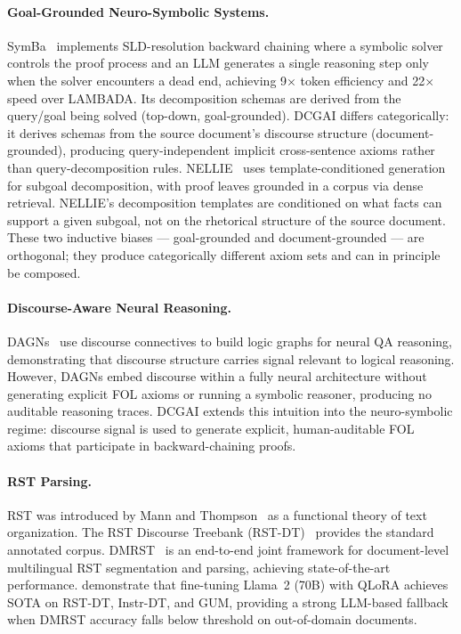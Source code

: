 \documentclass[11pt,letterpaper]{article}
\begin{document}
\paragraph{Goal-Grounded Neuro-Symbolic Systems.}
SymBa~\citep{Lee2024} implements SLD-resolution backward chaining where a symbolic solver controls the proof process
and an LLM generates a single reasoning step only when the solver encounters a dead end, achieving 9$\times$ token
efficiency and 22$\times$ speed over LAMBADA. Its decomposition schemas are derived from the query/goal being solved
(top-down, goal-grounded). DCGAI differs categorically: it derives schemas from the source document's discourse
structure (document-grounded), producing query-independent implicit cross-sentence axioms rather than
query-decomposition rules. NELLIE~\citep{Weir2024} uses template-conditioned generation for subgoal decomposition,
with proof leaves grounded in a corpus via dense retrieval. NELLIE's decomposition templates are conditioned on what
facts can support a given subgoal, not on the rhetorical structure of the source document. These two inductive biases
--- goal-grounded and document-grounded --- are orthogonal; they produce categorically different axiom sets and can
in principle be composed.

\paragraph{Discourse-Aware Neural Reasoning.}
DAGNs~\citep{Huang2022} use discourse connectives to build logic graphs for neural QA reasoning, demonstrating that
discourse structure carries signal relevant to logical reasoning. However, DAGNs embed discourse within a fully neural
architecture without generating explicit FOL axioms or running a symbolic reasoner, producing no auditable reasoning
traces. DCGAI extends this intuition into the neuro-symbolic regime: discourse signal is used to generate explicit,
human-auditable FOL axioms that participate in backward-chaining proofs.

\paragraph{RST Parsing.}
RST was introduced by Mann and Thompson~\citep{Mann1988} as a functional theory of text organization. The RST
Discourse Treebank (RST-DT)~\citep{Carlson2001} provides the standard annotated corpus. DMRST~\citep{Liu2021} is an
end-to-end joint framework for document-level multilingual RST segmentation and parsing, achieving state-of-the-art
performance. \citet{Maekawa2024} demonstrate that fine-tuning Llama~2 (70B) with QLoRA achieves SOTA on RST-DT,
Instr-DT, and GUM, providing a strong LLM-based fallback when DMRST accuracy falls below threshold on out-of-domain
documents.
\end{document}

